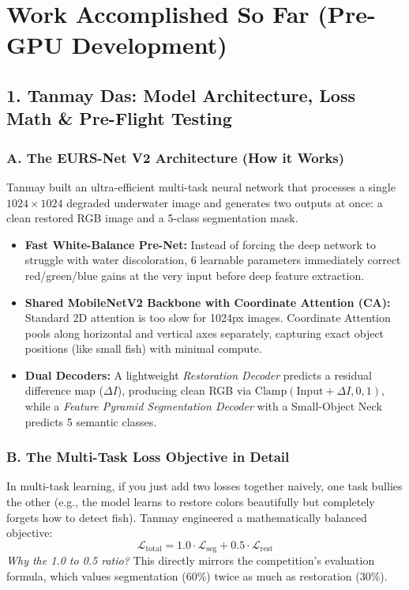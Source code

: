 \documentclass[10pt,a4paper]{article}
\begin{document}
\section{Work Accomplished So Far (Pre-GPU Development)}

\subsection{1. Tanmay Das: Model Architecture, Loss Math \& Pre-Flight Testing}

\subsubsection{A. The EURS-Net V2 Architecture (How it Works)}
Tanmay built an ultra-efficient multi-task neural network that processes a single $1024 \times 1024$ degraded underwater image and generates two outputs at once: a clean restored RGB image and a 5-class segmentation mask.
\begin{itemize}[noitemsep,topsep=1pt]
    \item \textbf{Fast White-Balance Pre-Net:} Instead of forcing the deep network to struggle with water discoloration, 6 learnable parameters immediately correct red/green/blue gains at the very input before deep feature extraction.
    \item \textbf{Shared MobileNetV2 Backbone with Coordinate Attention (CA):} Standard 2D attention is too slow for 1024px images. Coordinate Attention pools along horizontal and vertical axes separately, capturing exact object positions (like small fish) with minimal compute.
    \item \textbf{Dual Decoders:} A lightweight \textit{Restoration Decoder} predicts a residual difference map ($\Delta I$), producing clean RGB via $\text{Clamp}(\text{Input} + \Delta I, 0, 1)$, while a \textit{Feature Pyramid Segmentation Decoder} with a Small-Object Neck predicts 5 semantic classes.
\end{itemize}

\subsubsection{B. The Multi-Task Loss Objective in Detail}
In multi-task learning, if you just add two losses together naively, one task bullies the other (e.g., the model learns to restore colors beautifully but completely forgets how to detect fish). Tanmay engineered a mathematically balanced objective:
\begin{equation*}
    \mathcal{L}_{\text{total}} = 1.0 \cdot \mathcal{L}_{\text{seg}} + 0.5 \cdot \mathcal{L}_{\text{rest}}
\end{equation*}
\textit{Why the 1.0 to 0.5 ratio?} This directly mirrors the competition's evaluation formula, which values segmentation ($60\%$) twice as much as restoration ($30\%$).
\end{document}
